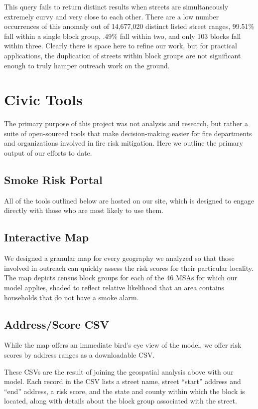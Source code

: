 \documentclass{sig-alternate}
\begin{document}
This query fails to return distinct results when streets are simultaneously extremely curvy and very close to each other. There are a low number occurrences of this anomaly out of 14,677,020 distinct listed street ranges, 99.51\% fall within a single block group, .49\% fall within two, and only 103 blocks fall within three. Clearly there is space here to refine our work, but for practical applications, the duplication of streets within block groups are not significant enough to truly hamper outreach work on the ground.

\section{Civic Tools}

The primary purpose of this project was not analysis and research, but rather a suite of open-sourced tools that make decision-making easier for fire departments and organizations involved in fire risk mitigation. Here we outline the primary output of our efforts to date.

\subsection{Smoke Risk Portal}

All of the tools outlined below are hosted on our site, which is designed to engage directly with those who are most likely to use them. 

\subsection{Interactive Map}

We designed a granular map for every geography we analyzed so that those involved in outreach can quickly assess the risk scores for their particular locality. The map depicts census block groups for each of the 46 MSAs for which our model applies, shaded to reflect relative likelihood that an area contains households that do not have a smoke alarm.

\subsection{Address/Score CSV}

While the map offers an immediate bird's eye view of the model, we offer risk scores by address ranges as a downloadable CSV.

These CSVs are the result of joining the geospatial analysis above with our model. Each record in the CSV lists a street name, street ``start'' address and ``end'' address, a risk score, and the state and county within which the block is located, along with details about the block group associated with the street.
\end{document}
